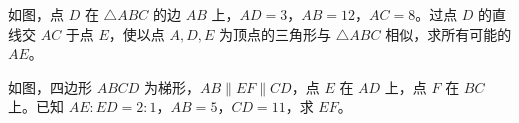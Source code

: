 \documentclass{exam-zh}
\begin{document}
\begin{problem}[points=10]
  \noindent
  \begin{minipage}[t]{\dimexpr\linewidth-60mm-6mm\relax}
    \vspace{0pt}
    如图，点 $D$ 在 $\triangle ABC$ 的边 $AB$ 上，$AD=3$，$AB=12$，$AC=8$。过点 $D$ 的直线交 $AC$ 于点 $E$，使以点 $A,D,E$ 为顶点的三角形与 $\triangle ABC$ 相似，求所有可能的 $AE$。

    
  \end{minipage}\hfill
  \begin{diagramcoltikz}{60mm}{先锁定共同角 $A$，再分类讨论另外两个顶点的对应。}
  }
  \end{diagramcoltikz}
  \par\medskip
  \answerarea[62mm]
\end{problem}




\begin{problem}[points=10]
  \noindent
  \begin{minipage}[t]{\dimexpr\linewidth-60mm-6mm\relax}
    \vspace{0pt}
    如图，四边形 $ABCD$ 为梯形，$AB\parallel EF\parallel CD$，点 $E$ 在 $AD$ 上，点 $F$ 在 $BC$ 上。已知 $AE:ED=2:1$，$AB=5$，$CD=11$，求 $EF$。

    
  \end{minipage}\hfill
  \begin{diagramcoltikz}{60mm}{三条平行线把两条腰按同一比例分割。}
  }
  \end{diagramcoltikz}
  \par\medskip
  \answerarea[60mm]
\end{problem}
\end{document}
